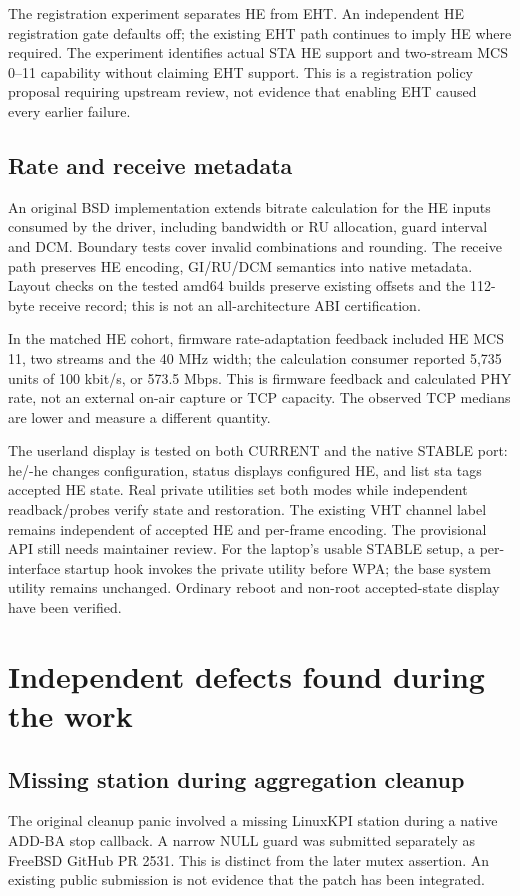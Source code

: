 \documentclass[11pt,letterpaper,oneside]{article}
\begin{document}
The registration experiment separates HE from EHT. An independent HE registration gate defaults off; the existing EHT path continues to imply HE where required. The experiment identifies actual STA HE support and two-stream MCS 0--11 capability without claiming EHT support. This is a registration policy proposal requiring upstream review, not evidence that enabling EHT caused every earlier failure.

\subsection{Rate and receive metadata}
An original BSD implementation extends bitrate calculation for the HE inputs consumed by the driver, including bandwidth or RU allocation, guard interval and DCM. Boundary tests cover invalid combinations and rounding. The receive path preserves HE encoding, GI/RU/DCM semantics into native metadata. Layout checks on the tested amd64 builds preserve existing offsets and the 112-byte receive record; this is not an all-architecture ABI certification.

In the matched HE cohort, firmware rate-adaptation feedback included HE MCS 11, two streams and the 40 MHz width; the calculation consumer reported 5,735 units of 100 kbit/s, or 573.5 Mbps. This is firmware feedback and calculated PHY rate, not an external on-air capture or TCP capacity. The observed TCP medians are lower and measure a different quantity.

The userland display is tested on both CURRENT and the native STABLE port: he/-he changes configuration, status displays configured HE, and list sta tags accepted HE state. Real private utilities set both modes while independent readback/probes verify state and restoration. The existing VHT channel label remains independent of accepted HE and per-frame encoding. The provisional API still needs maintainer review. For the laptop's usable STABLE setup, a per-interface startup hook invokes the private utility before WPA; the base system utility remains unchanged. Ordinary reboot and non-root accepted-state display have been verified.

\section{Independent defects found during the work}
\subsection{Missing station during aggregation cleanup}
The original cleanup panic involved a missing LinuxKPI station during a native ADD-BA stop callback. A narrow NULL guard was submitted separately as FreeBSD GitHub PR 2531. This is distinct from the later mutex assertion. An existing public submission is not evidence that the patch has been integrated.
\end{document}
